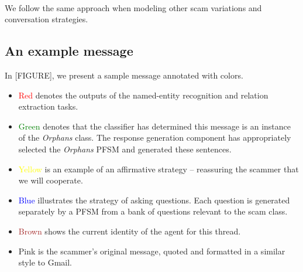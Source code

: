 \begin{figure}
  ~ %
\end{figure}

We follow the same approach when modeling other scam variations and conversation strategies.

\subsection{An example message}
In [FIGURE], we present a sample message annotated with colors.
\begin{itemize}
\item \textcolor{Red}{Red} denotes the outputs of the named-entity recognition and relation extraction tasks.
\item \textcolor{Green}{Green} denotes that the classifier has determined this message is an instance of the \textit{Orphans} class. The response generation component has appropriately selected the \textit{Orphans} PFSM and generated these sentences.
\item \textcolor{Yellow}{Yellow} is an example of an affirmative strategy -- reassuring the scammer that we will cooperate.
\item \textcolor{Blue}{Blue} illustrates the strategy of asking questions. Each question is generated separately by a PFSM from a bank of questions relevant to the scam class.
\item \textcolor{Brown}{Brown} shows the current identity of the agent for this thread.
\item \textcolor{CarnationPink}{Pink} is the scammer's original message, quoted and formatted in a similar style to Gmail.
\end{itemize}

